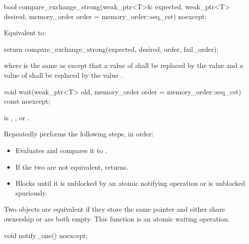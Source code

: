 %
\begin{itemdecl}
bool compare_exchange_strong(weak_ptr<T>& expected, weak_ptr<T> desired,
                             memory_order order = memory_order::seq_cst) noexcept;
\end{itemdecl}

\begin{itemdescr}
\pnum
\effects
Equivalent to:
\begin{codeblock}
return compare_exchange_strong(expected, desired, order, fail_order);
\end{codeblock}
where  is the same as 
except that a value of 
shall be replaced by the value  and
a value of 
shall be replaced by the value .
\end{itemdescr}

%
\begin{itemdecl}
void wait(weak_ptr<T> old, memory_order order = memory_order::seq_cst) const noexcept;
\end{itemdecl}

\begin{itemdescr}
\pnum
\expects
{} is
,
, or
.

\pnum
\effects
Repeatedly performs the following steps, in order:
\begin{itemize}
\item
  Evaluates  and compares it to .
\item
  If the two are not equivalent, returns.
\item
  Blocks until it
  is unblocked by an atomic notifying operation or is unblocked spuriously.
\end{itemize}

\pnum
\remarks
Two  objects are equivalent
if they store the same pointer and either share ownership or are both empty.
This function is an atomic waiting operation.
\end{itemdescr}


%
\begin{itemdecl}
void notify_one() noexcept;
\end{itemdecl}

